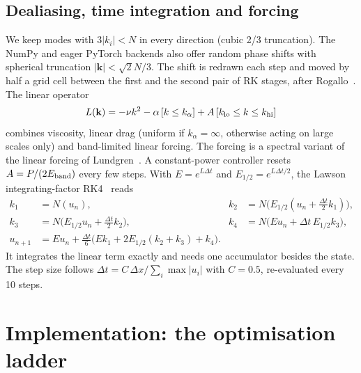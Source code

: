 \documentclass[11pt]{article}
\begin{document}
\subsection{Dealiasing, time integration and forcing}
We keep modes with $3|k_i|<N$ in every direction (cubic 2/3 truncation). The NumPy and eager
PyTorch backends also offer random phase shifts with spherical truncation
$|\mathbf k|<\sqrt2N/3$. The shift is redrawn each step and moved by half a grid cell between
the first and the second pair of RK stages, after Rogallo~\cite{rogallo1981numerical}. The
linear operator
\begin{equation}
L(\mathbf k) = -\nu k^2 - \alpha\,[k\le k_\alpha] + A\,[k_{\rm lo}\le k\le k_{\rm hi}]
\end{equation}
combines viscosity, linear drag (uniform if $k_\alpha=\infty$, otherwise acting on large scales
only) and band-limited linear forcing. The forcing is a spectral variant of the linear forcing
of Lundgren~\cite{lundgren2003linearly,rosales2005linear}. A constant-power controller resets
$A=P/(2E_{\rm band})$ every few steps. With $E=e^{L\Delta t}$ and $E_{1/2}=e^{L\Delta t/2}$, the
Lawson integrating-factor RK4~\cite{lawson1967generalized} reads
\begin{align}
k_1&=N(u_n), & k_2&=N\!\big(E_{1/2}(u_n+\tfrac{\Delta t}{2}k_1)\big), \nonumber\\
k_3&=N\!\big(E_{1/2}u_n+\tfrac{\Delta t}{2}k_2\big), & k_4&=N\!\big(Eu_n+\Delta t\,E_{1/2}k_3\big),
\nonumber\\
u_{n+1}&=Eu_n+\tfrac{\Delta t}{6}\big(Ek_1+2E_{1/2}(k_2+k_3)+k_4\big). &&
\end{align}
It integrates the linear term exactly and needs one accumulator besides the state. The step
size follows $\Delta t=C\,\Delta x/\sum_i\max|u_i|$ with $C=0.5$, re-evaluated every 10 steps.

\section{Implementation: the optimisation ladder}
\label{sec:impl}
\end{document}
